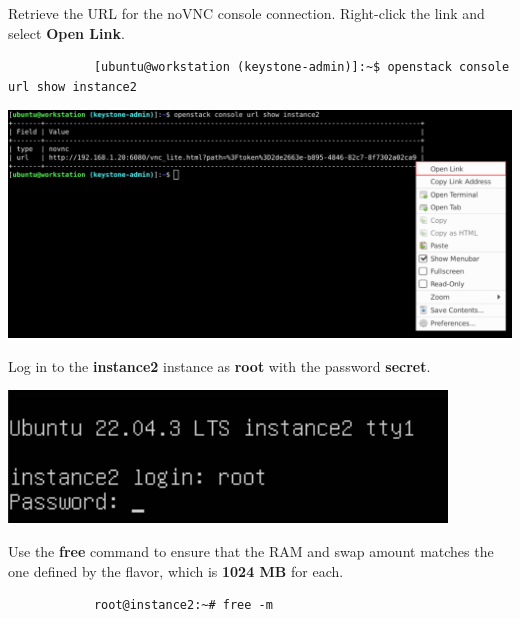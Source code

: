 \documentclass[letterpaper, 12pt]{article}
\begin{document}
\begin{enumerate}
    \begin{labstep}
        Retrieve the URL for the noVNC console connection.
        Right-click the link and select \textbf{Open Link}.
        \begin{lstlisting}
            [ubuntu@workstation (keystone-admin)]:~$ openstack console url show instance2
        \end{lstlisting}

        \begin{center}
            \includegraphics[width=\linewidth]{images/part5/step5.png}
        \end{center}
    \end{labstep}

    \begin{labstep}
        Log in to the \textbf{instance2} instance as \textbf{root} with the password \textbf{secret}.

        \begin{center}
            \includegraphics[width=\linewidth]{images/part5/step6.png}
        \end{center}
    \end{labstep}

    \begin{labstep}
        Use the \textbf{free} command to ensure that the RAM and swap amount matches the one defined by the flavor, which is \textbf{1024 MB} for each.
        \begin{lstlisting}
            root@instance2:~# free -m
        \end{lstlisting}


\end{labstep}
\end{enumerate}
\end{document}

